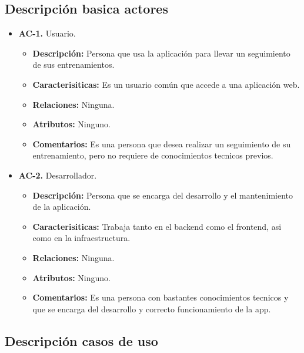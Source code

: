 \subsection {Descripción basica actores}
\begin{itemize}
  \item \textbf{AC-1.} Usuario.
  \begin{itemize}
    \item \textbf{Descripción: }Persona que usa la aplicación para llevar un seguimiento de sus entrenamientos.
    \item \textbf{Caracterisiticas:} Es un usuario común que accede a una aplicación web.
    \item \textbf{Relaciones:} Ninguna.
    \item \textbf{Atributos:} Ninguno.
    \item \textbf{Comentarios:} Es una persona que desea realizar un seguimiento de su entrenamiento, pero no requiere de conocimientos tecnicos previos.
  \end{itemize}
  \item \textbf{AC-2.} Desarrollador.
    \begin{itemize}
    \item \textbf{Descripción:} Persona que se encarga del desarrollo y el mantenimiento de la aplicación.
    \item \textbf{Caracterisiticas:} Trabaja tanto en el backend como el frontend, asi como en la infraestructura.
    \item \textbf{Relaciones:} Ninguna.
    \item \textbf{Atributos:} Ninguno.
    \item \textbf{Comentarios:} Es una persona con bastantes conocimientos tecnicos y que se encarga del desarrollo y correcto funcionamiento de la app.
  \end{itemize}
\end{itemize}
\newpage

\subsection {Descripción casos de uso}

